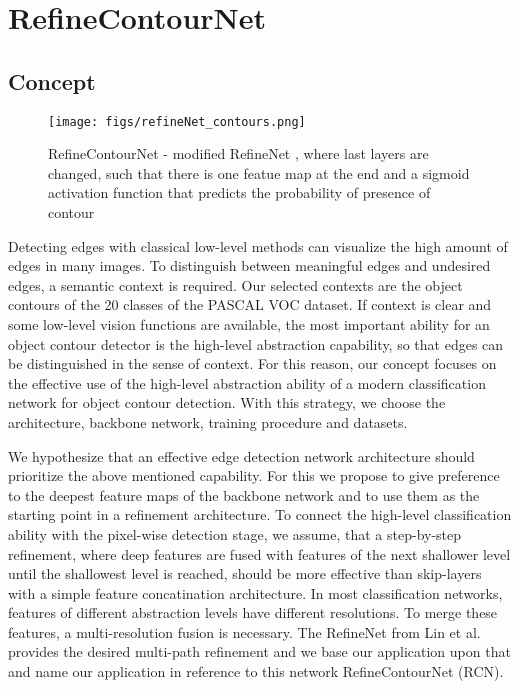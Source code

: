\documentclass[runningheads]{llncs}
\begin{document}
\section{RefineContourNet}
\subsection{Concept}
\begin{figure}[t]
\begin{center}
\texttt{[image: figs/refineNet\_contours.png]}
\end{center}
\caption{RefineContourNet - modified RefineNet \cite{RefineNet}, where last layers are changed, such that there is one featue map at the end and a sigmoid activation function that predicts the probability of presence of contour} \label{fig1}
\end{figure}
Detecting edges with classical low-level methods can visualize the high amount of edges in many images. To distinguish between meaningful edges and undesired edges, a semantic context is required. Our selected contexts are the object contours of the 20 classes of the PASCAL VOC dataset. If context is clear and some low-level vision functions are available, the most important ability for an object contour detector is the high-level abstraction capability, so that edges can be distinguished in the sense of context. For this reason, our concept focuses on the effective use of the high-level abstraction ability of a modern classification network for object contour detection. With this strategy, we choose the architecture, backbone network, training procedure and datasets.

We hypothesize that an effective edge detection network architecture should prioritize the above mentioned capability. For this we propose to give preference to the deepest feature maps of the backbone network and to use them as the starting point in a refinement architecture. To connect the high-level classification ability with the pixel-wise detection stage, we assume, that a step-by-step refinement, where deep features are fused with features of the next shallower level until the shallowest level is reached, should be more effective than skip-layers with a simple feature concatination architecture. In most classification networks, features of different abstraction levels have different resolutions. To merge these features, a multi-resolution fusion is necessary. The RefineNet from Lin et al. \cite{RefineNet} provides the desired multi-path refinement and we base our application upon that and name our application in reference to this network RefineContourNet (RCN).
\end{document}
